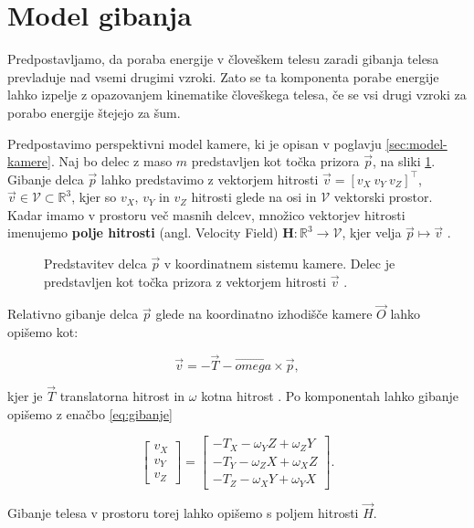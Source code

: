 \section{Model gibanja}\label{sec:model-gibanja}
Predpostavljamo, da poraba energije v človeškem telesu zaradi gibanja telesa prevladuje nad vsemi
drugimi vzroki. Zato se ta komponenta porabe energije lahko izpelje z opazovanjem kinematike \cite{levine2005measurement} človeškega telesa, če se vsi drugi vzroki za porabo energije štejejo za šum.

Predpostavimo perspektivni model kamere, ki je opisan v poglavju \ref{sec:model-kamere}.
Naj bo delec z maso $m$ predstavljen kot točka prizora $\vec{p}$, na sliki \ref{fig:model-gibanja}. Gibanje delca $\vec{p}$ lahko predstavimo z vektorjem hitrosti $\vec{v} = [v_X~v_Y~v_Z]^\top$, $\vec{v} \in \mathcal{V} \subset \mathbb{R}^3$, kjer so $v_X$, $v_Y$ in $v_Z$ hitrosti glede na osi in $\mathcal{V}$ vektorski prostor. Kadar imamo v prostoru več masnih delcev, množico vektorjev hitrosti imenujemo \textbf{polje hitrosti} (angl. Velocity Field) $\mathbf{H}: \mathbb{R}^3 \to \mathcal{V}$, kjer velja $\vec{p} \mapsto \vec{v}$ \cite{trucco1998introductory}.


\begin{figure}[htb]
\centering

\caption[Predstavitev delca $\vec{p}$ v koordinatnem sistemu kamere]{Predstavitev delca $\vec{p}$ v koordinatnem sistemu kamere. Delec je predstavljen kot točka prizora z vektorjem hitrosti $\vec{v}$ \cite{trucco1998introductory}.}
\label{fig:model-gibanja}
\end{figure}



Relativno gibanje delca $\vec{p}$ glede na koordinatno izhodišče kamere $\vec{O}$ lahko opišemo kot:

\begin{equation}
	\vec{v} = -\vec{T}-\vec{omega}\times\vec{p},
\end{equation}

kjer je $\vec{T}$ translatorna hitrost in $\omega$ kotna hitrost \cite{trucco1998introductory}. Po komponentah lahko gibanje opišemo z enačbo \eqref{eq:gibanje}

\begin{equation} \label{eq:gibanje}
	\begin{bmatrix}
	v_X \\ v_Y \\ v_Z
	\end{bmatrix}
    =
    \begin{bmatrix}
    - T_X - \omega_Y Z + \omega_Z Y \\
    - T_Y - \omega_Z X + \omega_X Z \\
    - T_Z - \omega_X Y + \omega_Y X
    \end{bmatrix}.
\end{equation}

Gibanje telesa v prostoru torej lahko opišemo s poljem hitrosti $\vec{H}$.


